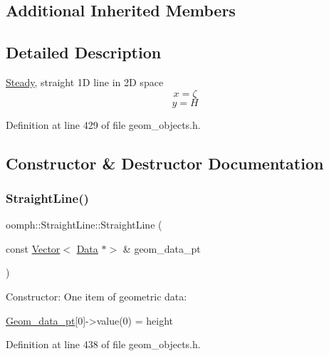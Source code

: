 \subsection*{Additional Inherited Members}


\subsection{Detailed Description}
\hyperlink{classoomph_1_1Steady}{Steady}, straight 1D line in 2D space \[ x = \zeta \] \[ y = H \] 

Definition at line 429 of file geom\+\_\+objects.\+h.



\subsection{Constructor \& Destructor Documentation}
\mbox{\label{classoomph_1_1StraightLine_aa6f5e08be3943889e1357ffec283528d}} 
\subsubsection{\texorpdfstring{Straight\+Line()}{StraightLine()}\hspace{0.1cm}{\footnotesize\ttfamily [1/3]}}
{\footnotesize\ttfamily oomph\+::\+Straight\+Line\+::\+Straight\+Line (\begin{DoxyParamCaption}\item[{const \hyperlink{classoomph_1_1Vector}{Vector}$<$ \hyperlink{classoomph_1_1Data}{Data} $\ast$$>$ \&}]{geom\+\_\+data\+\_\+pt }\end{DoxyParamCaption})\hspace{0.3cm}{\ttfamily [inline]}}



Constructor\+: One item of geometric data\+: 


\begin{DoxyCode}
\hyperlink{classoomph_1_1StraightLine_a7a9fcb055a7c56ac9944bf100349be5c}{Geom\_data\_pt}[0]->value(0) = height
\end{DoxyCode}
 

Definition at line 438 of file geom\+\_\+objects.\+h.

\mbox{\label{classoomph_1_1StraightLine_a90eb98ffdfc4fcfae90f49230bcd0603}} 
